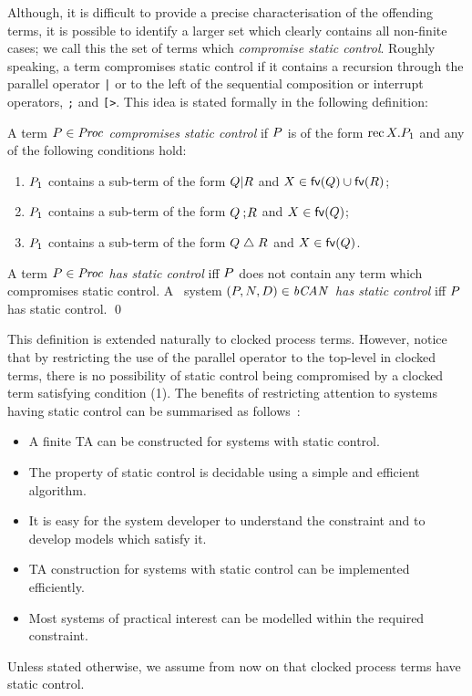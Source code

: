 Although, it is difficult to provide a precise characterisation of
the offending terms, it is possible to identify a larger set which
clearly contains all non-finite cases; we call this the set of terms
which \emph{compromise static control}. Roughly speaking, a term
compromises static control if it contains a recursion through the
parallel operator {\tt |} or to the left of the sequential composition
or interrupt operators, {\tt ;} and {\tt [>}. This idea is stated formally
in the following definition:
\begin{definition}
A term $\P \in \Proc{}$ \emph{compromises static
control} if $\P$ is of the form $\rec X.\P_1$ and any of the following
conditions hold:
\begin{enumerate}
\item $\P_1$ contains a sub-term of the form $\Q | \R$ and 
  $X \in \fv(\Q) \cup \fv(\R)$;
\item $\P_1$ contains a sub-term of the form $\Q \sq \R$ and 
  $X \in \fv(\Q)$;
\item $\P_1$ contains a sub-term of the form $\Q \interrupt \R$
  and $X \in \fv(\Q)$. 
\end{enumerate}
A term $\P \in \Proc{}$ \emph{has static control} iff $\P$ does not
contain any term which compromises static control.  A \bcandle\ system
$(\P,\N,\D) \in \Sys{}$ \emph{has static control} iff $\P$ has static
control.
\qed
\end{definition}
This definition is extended naturally to clocked process terms.
However, notice that by restricting the use of the parallel operator
to the top-level in clocked terms, there is no possibility of static
control being compromised by a clocked term satisfying condition (1).
The benefits of restricting attention to systems having static control
can be summarised as follows~\cite{gar:92}:
\begin{itemize}
\item A finite TA can be constructed for systems with static control. 
\item The property of static control is decidable using a simple and
  efficient algorithm.
\item It is easy for the system developer to understand the constraint
  and to develop models which satisfy it.
\item TA construction for systems with static control
  can be implemented efficiently.
\item Most systems of practical interest can be modelled within the 
  required constraint.
\end{itemize}
Unless stated otherwise, we assume from now on that clocked process terms 
have static control.

